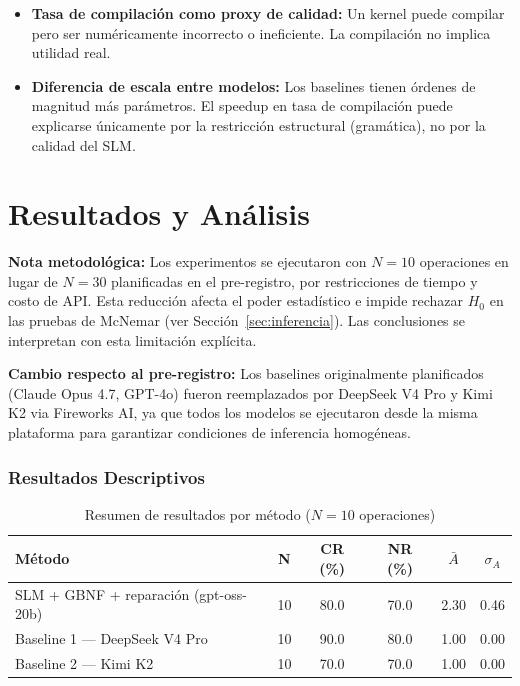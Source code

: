 \documentclass[12pt]{article}
\begin{document}
\begin{itemize}
  \item \textbf{Tasa de compilación como proxy de calidad:} Un kernel puede compilar
    pero ser numéricamente incorrecto o ineficiente. La compilación no implica
    utilidad real.

  \item \textbf{Diferencia de escala entre modelos:} Los baselines tienen órdenes de
    magnitud más parámetros. El speedup en tasa de compilación puede explicarse
    únicamente por la restricción estructural (gramática), no por la calidad del SLM.
\end{itemize}

\newpage
\part{Resultados y Análisis}

\textbf{Nota metodológica:} Los experimentos se ejecutaron con $N=10$ operaciones
en lugar de $N=30$ planificadas en el pre-registro, por restricciones de tiempo y
costo de API. Esta reducción afecta el poder estadístico e impide rechazar $H_0$ en
las pruebas de McNemar (ver Sección~\ref{sec:inferencia}). Las conclusiones se
interpretan con esta limitación explícita.

\textbf{Cambio respecto al pre-registro:} Los baselines originalmente planificados
(Claude Opus 4.7, GPT-4o) fueron reemplazados por DeepSeek V4 Pro y Kimi K2 via
Fireworks AI, ya que todos los modelos se ejecutaron desde la misma plataforma para
garantizar condiciones de inferencia homogéneas.

\section{Resultados Descriptivos}

\begin{table}[H]
\centering
\caption{Resumen de resultados por método ($N=10$ operaciones)}
\begin{tabular}{lccccc}
\toprule
\textbf{Método} & \textbf{N} & \textbf{CR (\%)} & \textbf{NR (\%)} &
  $\bar{A}$ & $\sigma_A$ \\
\midrule
SLM + GBNF + reparación (gpt-oss-20b) & 10 & 80.0 & 70.0 & 2.30 & 0.46 \\
Baseline 1 — DeepSeek V4 Pro          & 10 & 90.0 & 80.0 & 1.00 & 0.00 \\
Baseline 2 — Kimi K2                  & 10 & 70.0 & 70.0 & 1.00 & 0.00 \\
\bottomrule
\end{tabular}
\end{table}
\end{document}

